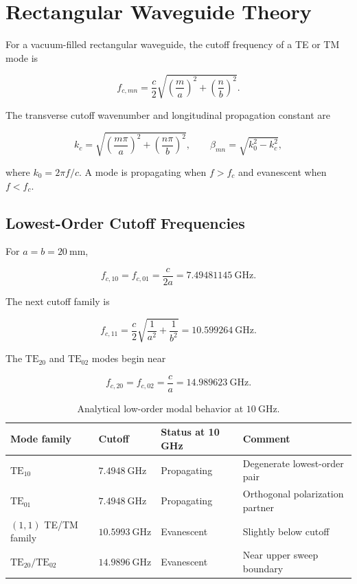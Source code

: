 \section{Rectangular Waveguide Theory}
\label{sec:rectangular-waveguide-theory}

For a vacuum-filled rectangular waveguide, the cutoff frequency of a TE or TM mode is \cite{pozar2011microwave}

\[
f_{c,mn}=
\frac{c}{2}
\sqrt{
\left(\frac{m}{a}\right)^2+
\left(\frac{n}{b}\right)^2
}.
\]

The transverse cutoff wavenumber and longitudinal propagation constant are

\[
k_c=
\sqrt{
\left(\frac{m\pi}{a}\right)^2+
\left(\frac{n\pi}{b}\right)^2
},
\qquad
\beta_{mn}=\sqrt{k_0^2-k_c^2},
\]

where \(k_0=2\pi f/c\). A mode is propagating when \(f>f_c\) and evanescent when \(f<f_c\).

\subsection{Lowest-Order Cutoff Frequencies}

For \(a=b=20~\mathrm{mm}\),

\[
f_{c,10}=f_{c,01}=\frac{c}{2a}=7.49481145~\mathrm{GHz}.
\]

The next cutoff family is

\[
f_{c,11}
=
\frac{c}{2}
\sqrt{\frac{1}{a^2}+\frac{1}{b^2}}
=
10.599264~\mathrm{GHz}.
\]

The \(\mathrm{TE}_{20}\) and \(\mathrm{TE}_{02}\) modes begin near

\[
f_{c,20}=f_{c,02}=\frac{c}{a}=14.989623~\mathrm{GHz}.
\]

\begin{table}[H]
\centering
\caption{Analytical low-order modal behavior at \(10~\mathrm{GHz}\).}
\label{tab:analytical-modes}
\begin{tabular}{@{}llll@{}}
\toprule
\textbf{Mode family} & \textbf{Cutoff} & \textbf{Status at 10 GHz} & \textbf{Comment} \\
\midrule
\(\mathrm{TE}_{10}\) & \(7.4948~\mathrm{GHz}\) & Propagating & Degenerate lowest-order pair \\
\(\mathrm{TE}_{01}\) & \(7.4948~\mathrm{GHz}\) & Propagating & Orthogonal polarization partner \\
\((1,1)\) TE/TM family & \(10.5993~\mathrm{GHz}\) & Evanescent & Slightly below cutoff \\
\(\mathrm{TE}_{20}/\mathrm{TE}_{02}\) & \(14.9896~\mathrm{GHz}\) & Evanescent & Near upper sweep boundary \\
\bottomrule
\end{tabular}
\end{table}

